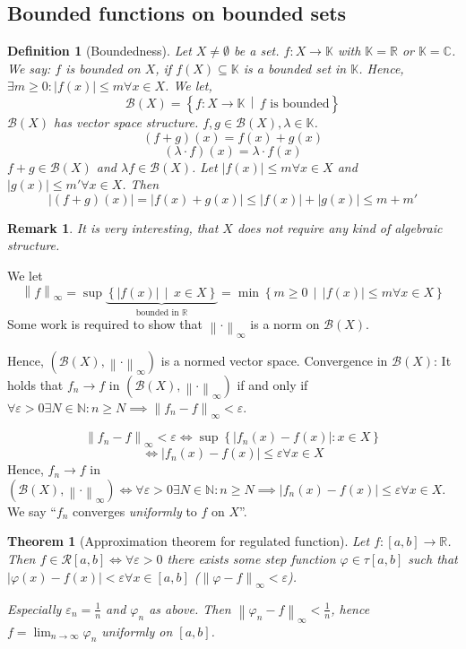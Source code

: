 \documentclass{article}
\newtheorem{theorem}{Theorem}  \numberwithin{theorem}{section}
\newtheorem{definition}{Definition}  \numberwithin{definition}{section}
\newtheorem{remark}{Remark}  \numberwithin{remark}{section}
\newcommand{\set}[1]{\left\{#1\right\}}
\newcommand{\setdef}[2]{\left\{\left.#1\,\middle|\,#2\right.\right\}}
\newcommand{\norm}[1]{\left\|#1\right\|}
\newcommand{\card}[1]{\left|#1\right|}
\begin{document}
\subsection{Bounded functions on bounded sets}

\begin{definition}[Boundedness] %
  Let $X \neq \emptyset$ be a set.
  $f: X \to \mathbb K$ with $\mathbb K = \mathbb R$ or $\mathbb K = \mathbb C$.
  We say: $f$ is bounded on $X$, if $f(X) \subseteq \mathbb K$ is a bounded set in $\mathbb K$.
  Hence, $\exists m \geq 0: \card{f(x)} \leq m \forall x \in X$.
  We let,
  \[ \mathcal B(X) = \setdef{f: X \to \mathbb K}{f \text{ is bounded}} \]
  $\mathcal B(X)$ has vector space structure.
  $f, g \in \mathcal B(X), \lambda \in \mathbb K$.
  \[ (f + g)(x) = f(x) + g(x) \]
  \[ (\lambda \cdot f)(x) = \lambda \cdot f(x) \]
  $f + g \in \mathcal B(X)$ and $\lambda f \in \mathcal B(X)$.
  Let $\card{f(x)} \leq m \forall x \in X$ and $\card{g(x)} \leq m' \forall x \in X$.
  Then
  \[ \card{(f + g)(x)} = \card{f(x) + g(x)} \leq \card{f(x)} + \card{g(x)} \leq m + m' \]
\end{definition}

\begin{remark}
  It is very interesting, that $X$ does not require any kind of algebraic structure.
\end{remark}

We let
\[
  \norm{f}_{\infty}
  = \sup\underbrace{\setdef{\card{f(x)}}{x \in X}}_{\text{bounded in } \mathbb R}
  = \min\setdef{m \geq 0}{\card{f(x)} \leq m \forall x \in X}
\]
Some work is required to show that $\norm{\cdot}_{\infty}$ is a norm on $\mathcal B(X)$.

Hence, $(\mathcal B(X), \norm{\cdot}_{\infty})$ is a normed vector space.
Convergence in $\mathcal B(X)$: It holds that $f_n \to f$ in $(\mathcal B(X), \norm{\cdot}_{\infty})$
if and only if $\forall \varepsilon > 0 \exists N \in \mathbb N: n \geq N \implies \norm{f_n - f}_{\infty} < \varepsilon$.

\[ \norm{f_n - f}_{\infty} < \varepsilon \iff \sup\set{\card{f_n(x) - f(x)}: x \in X} \]
\[ \iff \card{f_n(x) - f(x)} \leq \varepsilon \forall x \in X \]
Hence, $f_n \to f$ in $(\mathcal B(X), \norm{\cdot}_{\infty}) \iff \forall \varepsilon > 0 \exists N \in \mathbb N: n \geq N \implies \card{f_n(x) - f(x)} \leq \varepsilon \forall x \in X$.
We say \enquote{$f_n$ converges \emph{uniformly} to $f$ on $X$}.

\begin{theorem}[Approximation theorem for regulated function] %
  \label{approxthmreg}
  Let $f: [a, b] \to \mathbb R$. Then $f \in \mathcal R[a,b] \iff \forall \varepsilon > 0$ there exists some step function $\varphi \in \tau[a,b]$ such that $\card{\varphi(x) - f(x)} < \varepsilon \forall x \in [a,b]$ ($\norm{\varphi - f}_{\infty} < \varepsilon$).

  Especially $\varepsilon_n = \frac1n$ and $\varphi_n$ as above.
  Then $\norm{\varphi_n - f}_{\infty} < \frac1n$, hence $f = \lim_{n\to\infty} \varphi_n$ uniformly on $[a,b]$.
\end{theorem}
\end{document}
